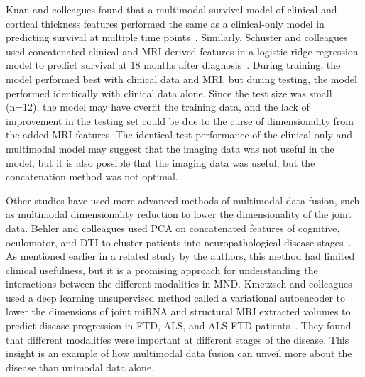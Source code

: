 Kuan and colleagues found that a multimodal survival model of clinical and cortical thickness features performed the same as a clinical-only model in predicting survival at multiple time points~\cite{kuanAccuratePersonalizedSurvival2023}.
Similarly, Schuster and colleagues used concatenated clinical and MRI-derived features in a logistic ridge regression model to predict survival at 18 months after diagnosis~\cite{schusterSurvivalPredictionAmyotrophic2017}.
During training, the model performed best with clinical data and MRI, but during testing, the model performed identically with clinical data alone.
Since the test size was small (n=12), the model may have overfit the training data, and the lack of improvement in the testing set could be due to the curse of dimensionality from the added MRI features.
The identical test performance of the clinical-only and multimodal model may suggest that the imaging data was not useful in the model, but it is also possible that the imaging data was useful, but the concatenation method was not optimal.

Other studies have used more advanced methods of multimodal data fusion, such as multimodal dimensionality reduction to lower the dimensionality of the joint data.
Behler and colleagues used PCA on concatenated features of cognitive, oculomotor, and DTI to cluster patients into neuropathological disease stages~\cite{behlerMultimodalVivoStaging2022}.
As mentioned earlier in a related study by the authors, this method had limited clinical usefulness, but it is a promising approach for understanding the interactions between the different modalities in MND.
Kmetzsch and colleagues used a deep learning unsupervised method called a variational autoencoder to lower the dimensions of joint miRNA and structural MRI extracted volumes to predict disease progression in FTD, ALS, and ALS-FTD patients~\cite{kmetzschDiseaseProgressionScore2022a}.
They found that different modalities were important at different stages of the disease.
This insight is an example of how multimodal data fusion can unveil more about the disease than unimodal data alone.

